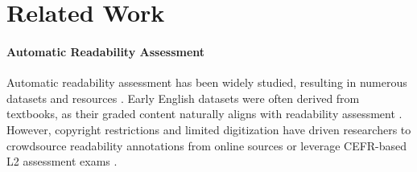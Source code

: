 \section{Related Work}
\label{sec:related}






  




 
\paragraph{Automatic Readability Assessment}
Automatic readability assessment has been widely studied, resulting in numerous datasets and resources \cite{collins-thompson-callan-2004-language,pitler-nenkova-2008-revisiting,feng-etal-2010-comparison,vajjala-meurers-2012-improving,xu-etal-2015-problems,xia-etal-2016-text,nadeem-ostendorf-2018-estimating,vajjala-lucic-2018-onestopenglish,deutsch-etal-2020-linguistic,lee-etal-2021-pushing}. Early English datasets were often derived from textbooks, as their graded content naturally aligns with readability assessment \cite{vajjala-2022-trends}. However, copyright restrictions and limited digitization have driven researchers to crowdsource readability annotations from online sources \cite{vajjala-meurers-2012-improving,vajjala-lucic-2018-onestopenglish} or leverage CEFR-based L2 assessment exams \cite{xia-etal-2016-text}.
 

